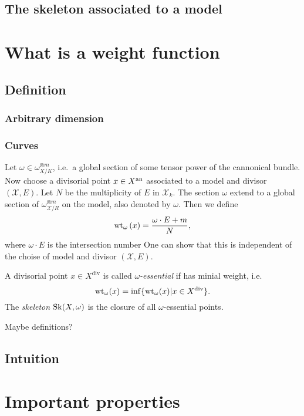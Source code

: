 \subsection{The skeleton associated to a model} \label{sec:the_skeleton_associated_to_a_model}

\section{What is a weight function} \label{sec:what_is_a_weight_function}

\subsection{Definition} \label{sec:definition}

\subsubsection{Arbitrary dimension} \label{sec:arbitrary_dimension}

\subsubsection{Curves} \label{sec:curves}
Let $\omega \in \omega_{X / K}^{\otimes m}$, i.e.\ a global section of some tensor power of the cannonical bundle. 
Now choose a divisorial point $x \in X{}^{\text{an}}$ associated to a model and divisor $(\mathscr X, E)$. 
Let $N$ be the multiplicity of $E$ in $\mathscr X_k$. 
The section $\omega$ extend to a global section of $\omega_{\mathscr X / R} ^{ \otimes m}$ on the model, also denoted by $\omega$. 
Then we define \[
	\operatorname{wt}_{\omega}\left(x  \right)  = \frac{\omega \cdot E + m}{N}
,\] 
where $\omega \cdot E$ is the intersection number 
One can show that this is independent of the choise of model and divisor $(\mathscr X, E)$.  

\begin{definition}
	A divisorial point $x \in X^{\text{div}}$ is called \emph{$\omega$-essential} if has minial weight, i.e. \[
		\operatorname{wt}_\omega(x) = \inf \{\operatorname{wt}_\omega(x) | x \in X^{\text{div}}\} 
	.\] 
	The \emph{skeleton $\operatorname{Sk}(X, \omega)$} is the closure of all $\omega$-essential points.  
\end{definition}

Maybe definitions?

\subsection{Intuition} \label{sec:intuition}


\section{Important properties} \label{sec:important_properties}

